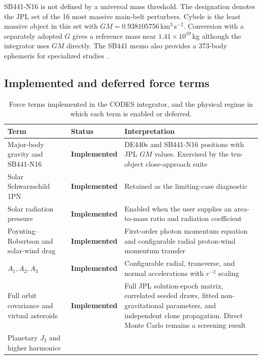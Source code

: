 SB441-N16 is not defined by a universal mass threshold. The designation
denotes the JPL set of the 16 most massive main-belt perturbers. Cybele is the
least massive object
in this set with $GM=0.938105756$\,km$^3$\,s$^{-2}$. Conversion with a
separately adopted $G$ gives a reference mass near
$1.41\times10^{19}$\,kg although the integrator uses $GM$ directly.
The SB441 memo also provides a 373-body ephemeris for specialized studies
\cite{Farnocchia2021SB441}.

\subsection{Implemented and deferred force terms}

\begin{table}
\caption{Force terms implemented in the CODES integrator, and the
physical regime in which each term is enabled or deferred.}
\label{tab:c7-force-terms}
\centering
\begin{tabular}{@{}M{43mm}C{37mm}M{85mm}@{}}
\toprule
\color{cGold}\textbf{Term} &
\color{cGold}\textbf{Status} &
\color{cGold}\textbf{Interpretation}\\
\midrule
Major-body gravity and SB441-N16 &
\color{cTeal}\textbf{Implemented} &
DE440s and SB441-N16 positions with JPL $GM$ values. Exercised by the
ten-object close-approach suite\\
\cmidrule(lr){1-3}
Solar Schwarzschild 1PN &
\color{cTeal}\textbf{Implemented} &
Retained as the  limiting-case diagnostic\\
\cmidrule(lr){1-3}
Solar radiation pressure &
\color{cTeal}\textbf{Implemented} &
Enabled when the user supplies an area-to-mass ratio and radiation
coefficient\\
\cmidrule(lr){1-3}
Poynting--Robertson and solar-wind drag &
\color{cTeal}\textbf{Implemented} &
First-order photon momentum equation and configurable radial proton-wind
momentum transfer\\
\cmidrule(lr){1-3}
$A_1,A_2,A_3$ &
\color{cTeal}\textbf{Implemented} &
Configurable radial, transverse, and normal accelerations with $r^{-2}$
scaling\\
\cmidrule(lr){1-3}
Full orbit covariance and virtual asteroids &
\color{cTeal}\textbf{Implemented} &
Full JPL solution-epoch matrix, correlated seeded draws, fitted
non-gravitational parameters, and independent clone propagation. Direct
Monte Carlo remains a screening result\\
\cmidrule(lr){1-3}
Planetary $J_2$ and higher harmonics &

\end{tabular}
\end{table}
